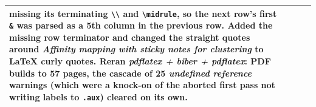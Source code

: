 \documentclass[a4paper,11pt]{article}
\begin{document}
\begin{longtable}{@{}>{\raggedright\arraybackslash}p{1.8cm}>{\raggedright\arraybackslash}p{2.8cm}>{\raggedright\arraybackslash}p{4.5cm}>{\raggedright\arraybackslash}p{4.5cm}@{}}
  missing its terminating \texttt{\textbackslash\textbackslash} and
  \texttt{\textbackslash midrule}, so the next row's first \texttt{\&}
  was parsed as a 5th column in the previous row. Added the missing
  row terminator and changed the straight quotes around
  \emph{Affinity mapping with sticky notes for clustering} to LaTeX
  curly quotes. Reran \emph{pdflatex + biber + pdflatex}: PDF builds
  to 57 pages, the cascade of 25 \emph{undefined reference} warnings
  (which were a knock-on of the aborted first pass not writing labels
  to \texttt{.aux}) cleared on its own. \\
\midrule
\bottomrule
\end{longtable}
\end{document}
